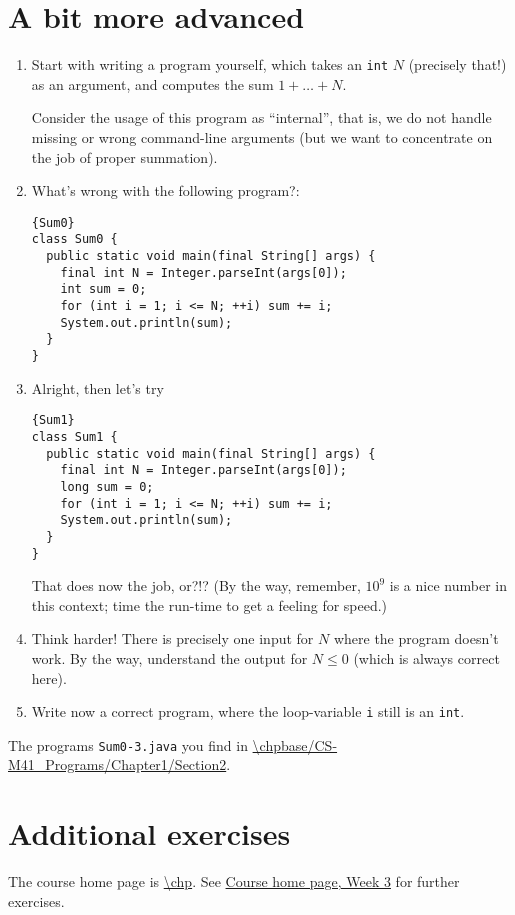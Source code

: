 \documentclass[11pt]{article}
\begin{document}
\section{A bit more advanced}
\label{sec:advanced}

\begin{enumerate}
\item Start with writing a program yourself, which takes an \texttt{int} $N$ (precisely that!) as an argument, and computes the sum $1 + \dots + N$.

  Consider the usage of this program as ``internal'', that is, we do not handle missing or wrong command-line arguments (but we want to concentrate on the job of proper summation).
\item What's wrong with the following program?:
  \begin{lstlisting}{Sum0}
class Sum0 {
  public static void main(final String[] args) {
    final int N = Integer.parseInt(args[0]);
    int sum = 0;
    for (int i = 1; i <= N; ++i) sum += i;
    System.out.println(sum);
  }
}
  \end{lstlisting}
\item Alright, then let's try
  \begin{lstlisting}{Sum1}
class Sum1 {
  public static void main(final String[] args) {
    final int N = Integer.parseInt(args[0]);
    long sum = 0;
    for (int i = 1; i <= N; ++i) sum += i;
    System.out.println(sum);
  }
}
  \end{lstlisting}
  That does now the job, or?!? (By the way, remember, $10^9$ is a nice number in this context; time the run-time to get a feeling for speed.)
\item Think harder! There is precisely one input for $N$ where the program doesn't work. By the way, understand the output for $N \le 0$ (which is always correct here).
\item Write now a correct program, where the loop-variable \texttt{i} still is an \texttt{int}.
\end{enumerate}

The programs \texttt{Sum0-3.java} you find in \url{\chpbase/CS-M41_Programs/Chapter1/Section2}.


\section{Additional exercises}
\label{sec:addex}

The course home page is \url{\chp}. See \href{\chp#ExercisesWeek03}{Course home page, Week 3} for further exercises.
\end{document}
